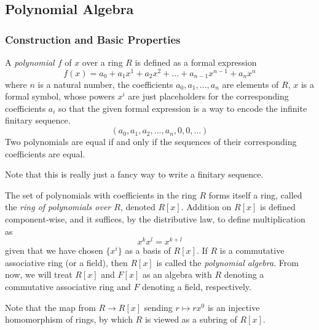 \documentclass{article}
\begin{document}
  \subsection{Polynomial Algebra}

    \subsubsection{Construction and Basic Properties}

      \begin{definition}
        A \textit{polynomial $f$} of $x$ over a ring $R$ is defined as a formal expression 
        \begin{equation}
          f(x) = a_0 + a_1 x^1 + a_2 x^2 + ...  + a_{n-1} x^{n-1} + a_n x^n
        \end{equation}
        where $n$ is a natural number, the coefficients $a_0, a_1, ..., a_n$ are elements of $R$, $x$ is a formal symbol, whose powers $x^i$ are just placeholders for the corresponding coefficients $a_i$ so that the given formal expression is a way to encode the infinite finitary sequence. 
        \begin{equation}
          (a_0, a_1, a_2, ..., a_n, 0, 0, ...)
        \end{equation}
        Two polynomials are equal if and only if the sequences of their corresponding coefficients are equal.
      \end{definition}

      Note that this is really just a fancy way to write a finitary sequence. 

      \begin{definition}
        The set of polynomials with coefficients in the ring $R$ forms itself a ring, called the \textit{ring of polynomials over $R$}, denoted $R[x]$. Addition on $R[x]$ is defined component-wise, and it suffices, by the distributive law, to define multiplication as
        \[x^k x^l = x^{k + l}\]
        given that we have chosen $\{x^i\}$ as a basis of $R[x]$. If $R$ is a commutative associative ring (or a field), then $R[x]$ is called the \textit{polynomial algebra}. From now, we will treat $R[x]$ and $F[x]$ as an algebra with $R$ denoting a commutative associative ring and $F$ denoting a field, respectively. 
      \end{definition}

      Note that the map from $R \longrightarrow R[x]$ sending $r \mapsto r x^0$ is an injective homomorphism of rings, by which $R$ is viewed as a subring of $R[x]$. 
\end{document}
